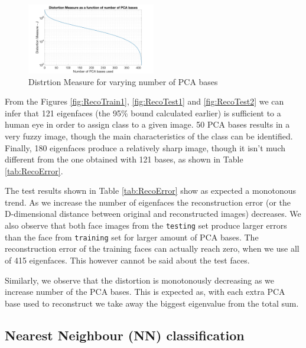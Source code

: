 \documentclass[10pt,twocolumn,letterpaper]{article}
\begin{document}
\begin{figure}[H]
\begin{center}
  
    \includegraphics[width=0.5\textwidth]{../results/DistMeasure}

  \caption{Distrtion Measure for varying number of PCA bases \label{fig:DistMeasure}}

\end{center}
\end{figure}
From the Figures \ref{fig:RecoTrain1},  \ref{fig:RecoTest1} and \ref{fig:RecoTest2} we can infer that 121 eigenfaces (the 95\% bound calculated earlier) is sufficient to a human eye in order to assign class to a given image. 50 PCA bases results in a very fuzzy image, though the main characteristics of the class can be identified. Finally, 180 eigenfaces produce a relatively sharp image, though it isn't much different from the one obtained with 121 bases, as shown in Table \ref{tab:RecoError}.

The test results shown in Table \ref{tab:RecoError} show as expected a monotonous trend. As we increase the number of eigenfaces the reconstruction error (or the D-dimensional distance between original and reconstructed images) decreases. We also observe that both face images from the {\tt\small testing} set produce larger errors than the face from {\tt\small training} set for larger amount of PCA bases. The reconstruction error of the training faces can actually reach zero, when we use all of 415 eigenfaces. This however cannot be said about the test faces.

Similarly, we observe that the distortion is monotonously decreasing as we increase number of the PCA bases. This is expected as, with each extra PCA base used to reconstruct we take away the biggest eigenvalue from the total sum.

\subsection{Nearest Neighbour (NN) classification}
\end{document}
